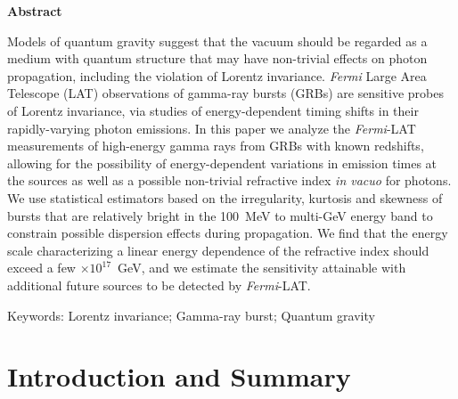 \documentclass[12pt]{article}
\begin{document}
\begin{center}
\vskip 0.1in

{\bf Abstract}

\end{center}

\baselineskip=18pt \noindent



Models of quantum gravity suggest that the vacuum should be regarded as a medium with quantum
structure that may have non-trivial effects on photon propagation,
including the violation of Lorentz invariance. {\it Fermi} Large Area Telescope (LAT) observations
of gamma-ray bursts (GRBs) are sensitive probes of
Lorentz invariance, via studies of energy-dependent timing shifts in their rapidly-varying photon emissions.
In this paper we analyze the {\it Fermi}-LAT measurements of high-energy gamma rays from GRBs
with known redshifts, allowing for the possibility of energy-dependent variations in emission times
at the sources as well as a possible non-trivial refractive index {\it in vacuo} for photons. We use
statistical estimators based on the irregularity, kurtosis and skewness of bursts that are relatively
bright in the 100~MeV to multi-GeV energy band to constrain possible dispersion effects during propagation.
We find that the energy scale characterizing a linear energy dependence of the refractive index should exceed
a few $\times 10^{17}$~GeV, and we estimate the sensitivity attainable with additional future sources
to be detected by {\it Fermi}-LAT.

\vskip 3mm

Keywords: Lorentz invariance; Gamma-ray burst; Quantum gravity
\vskip 5mm


\section{Introduction and Summary}
\end{document}
